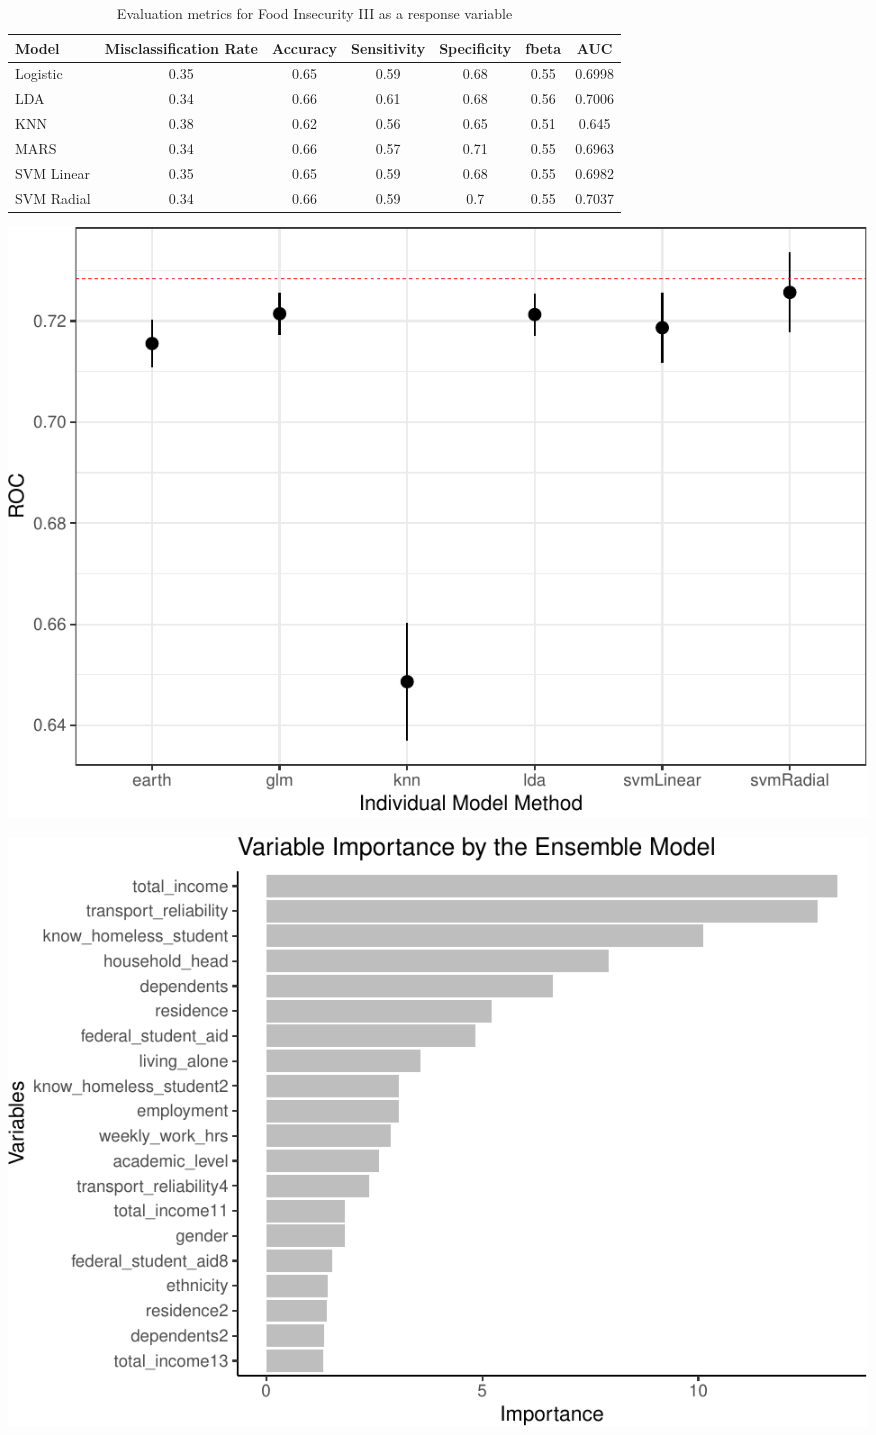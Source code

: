 \documentclass[
  10pt,
]{article}
\begin{document}
\begin{table}[H]

\caption{\label{tab:unnamed-chunk-17}Evaluation metrics for Food Insecurity III  as a response variable}
\centering
\fontsize{12}{14}\selectfont
\begin{tabular}[t]{lcccccc}
\toprule
Model & Misclassification Rate & Accuracy & Sensitivity & Specificity & fbeta & AUC\\
\midrule
Logistic & 0.35 & 0.65 & 0.59 & 0.68 & 0.55 & 0.6998\\
LDA & 0.34 & 0.66 & 0.61 & 0.68 & 0.56 & 0.7006\\
KNN & 0.38 & 0.62 & 0.56 & 0.65 & 0.51 & 0.645\\
MARS & 0.34 & 0.66 & 0.57 & 0.71 & 0.55 & 0.6963\\
SVM Linear & 0.35 & 0.65 & 0.59 & 0.68 & 0.55 & 0.6982\\
SVM Radial & 0.34 & 0.66 & 0.59 & 0.7 & 0.55 & 0.7037\\
\bottomrule
\end{tabular}
\end{table}

\includegraphics{phase2_report_files/figure-latex/unnamed-chunk-17-1}

\includegraphics{phase2_report_files/figure-latex/unnamed-chunk-18-1}
\end{document}
